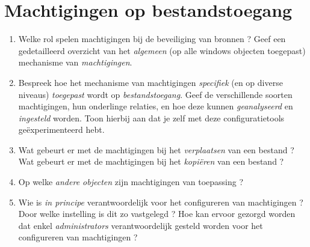 \documentclass{report}
\begin{document}
	\section{Machtigingen op bestandstoegang }
	\begin{enumerate}
		\item Welke rol spelen machtigingen bij de beveiliging van bronnen ? Geef een gedetailleerd overzicht van het \textit{algemeen} (op alle windows objecten toegepast) mechanisme van \textit{machtigingen}.
		
		\item Bespreek hoe het mechanisme van machtigingen \textit{specifiek} (en op diverse niveaus) \textit{toegepast} wordt op \textit{bestandstoegang}. Geef de verschillende soorten machtigingen, hun onderlinge relaties, en hoe deze kunnen \textit{geanalyseerd} en \textit{ingesteld} worden. Toon hierbij aan dat je zelf met deze configuratietools geëxperimenteerd hebt.
		
		\item Wat gebeurt er met de machtigingen bij het \textit{verplaatsen} van een bestand ? Wat gebeurt er met de machtigingen bij het \textit{kopiëren} van een bestand ?
		
		\item Op welke \textit{andere objecten} zijn machtigingen van toepassing ?
		
		\item Wie is \textit{in principe} verantwoordelijk voor het configureren van machtigingen ? Door welke instelling is dit zo vastgelegd ? Hoe kan ervoor gezorgd worden dat enkel \textit{administrators} verantwoordelijk gesteld worden voor het configureren van machtigingen ?
		
	\end{enumerate}
\end{document}
